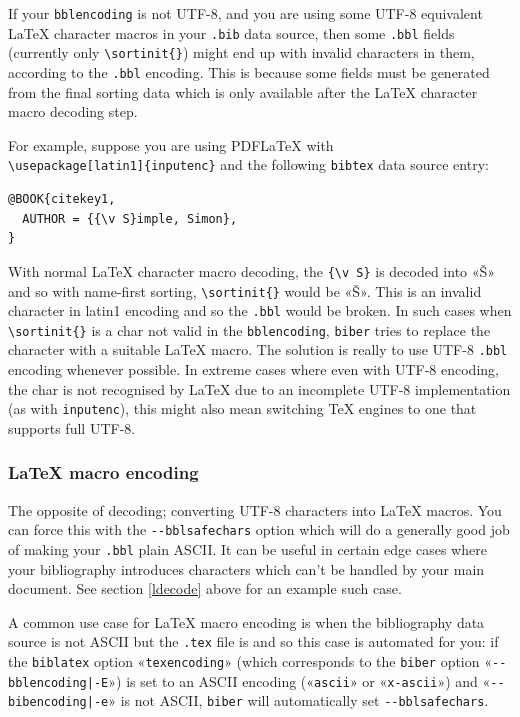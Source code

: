 \documentclass{ltxdockit}
\begin{document}
If your \verb+bblencoding+ is not UTF-8, and you are using some UTF-8
equivalent LaTeX character macros in your \verb+.bib+ data source, then some
\verb+.bbl+ fields (currently only \verb+\sortinit{}+) might end up
with invalid characters in them, according to the \verb+.bbl+
encoding. This is because some fields must be generated from the final
sorting data which is only available after the LaTeX character macro
decoding step.

For example, suppose you are using PDFLaTeX with\\
\verb+\usepackage[latin1]{inputenc}+ and the following \verb+bibtex+
data source entry:

\begin{verbatim}
@BOOK{citekey1,
  AUTHOR = {{\v S}imple, Simon},
}
\end{verbatim}

\noindent With normal LaTeX character macro decoding, the
\verb+{\v S}+ is decoded into «Š» and so with name-first sorting,
\verb+\sortinit{}+ would be «Š». This is an invalid character in
latin1 encoding and so the \verb+.bbl+ would be broken. In such cases
when \verb+\sortinit{}+ is a char not valid in the \verb+bblencoding+,
\verb+biber+ tries to replace the character with a suitable LaTeX
macro. The solution is really to use UTF-8 \verb+.bbl+ encoding whenever
possible. In extreme cases where even with UTF-8 encoding,
the char is not recognised by LaTeX due to an incomplete UTF-8
implementation (as with \verb+inputenc+), this might also mean
switching TeX engines to one that supports full UTF-8.

\subsubsection{LaTeX macro encoding}\label{lencode}

The opposite of decoding; converting UTF-8 characters into LaTeX macros.
You can force this with the \verb+--bblsafechars+ option which will do a
generally good job of making your \verb+.bbl+ plain ASCII. It can be useful
in certain edge cases where your bibliography introduces characters which
can't be handled by your main document. See section \ref{ldecode} above for
an example such case.

A common use case for LaTeX macro encoding is when the bibliography
data source is not ASCII but the \verb+.tex+ file is and so this case
is automated for you: if the \verb+biblatex+ option «\verb+texencoding+»
(which corresponds to the \verb+biber+ option «\verb+--bblencoding|-E+») is
set to an ASCII encoding («\verb+ascii+» or «\verb+x-ascii+») and
«\verb+--bibencoding|-e+» is not ASCII, \verb+biber+ will automatically set
\verb+--bblsafechars+.
\end{document}
